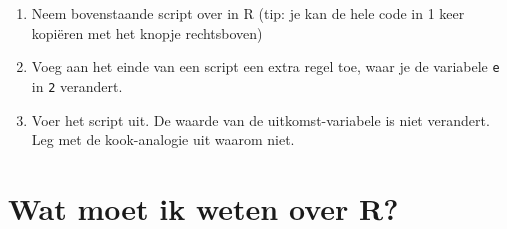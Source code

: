 \documentclass[
  b5paper,
  DIV=11,
  numbers=noendperiod]{scrreprt}
\providecommand{\tightlist}{%
  \setlength{\itemsep}{0pt}\setlength{\parskip}{0pt}}\usepackage{longtable,booktabs,array}
\theoremstyle{definition}
\theoremstyle{remark}
\begin{document}
\begin{enumerate}
\def\labelenumi{\arabic{enumi}.}
\tightlist
\item
  Neem bovenstaande script over in R (tip: je kan de hele code in 1 keer
  kopiëren met het knopje rechtsboven)
\item
  Voeg aan het einde van een script een extra regel toe, waar je de
  variabele \texttt{e} in \texttt{2} verandert.
\item
  Voer het script uit. De waarde van de uitkomst-variabele is niet
  verandert. Leg met de kook-analogie uit waarom niet.
\end{enumerate}

\chapter{Wat moet ik weten over R?}\label{wat-moet-ik-weten-over-r}
\end{document}
